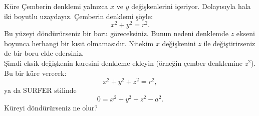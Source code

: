 \begin{surferPage}[Küre]{Küre}
Çemberin denklemi yalnızca $x$ ve $y$ değişkenlerini içeriyor. Dolayısıyla hala iki boyutlu uzaydayız. Çemberin denklemi şöyle:
\[x^2+y^2=r^2.\]
Bu yüzeyi döndürürseniz bir boru göreceksiniz. Bunun nedeni denklemde $z$ ekseni boyunca herhangi bir kısıt olmamasıdır. Nitekim $x$ değişkenini $z$ ile değiştirirseniz de bir boru elde edersiniz.\\
Şimdi eksik değişkenin karesini denkleme ekleyin (örneğin çember denklemine $z^2$). 
Bu bir küre verecek:
\[x^2+y^2+z^2=r^2,\]
ya da SURFER stilinde
\[0=x^2+y^2+z^2-a^2.\]
Küreyi döndürürseniz ne olur?
\end{surferPage}
